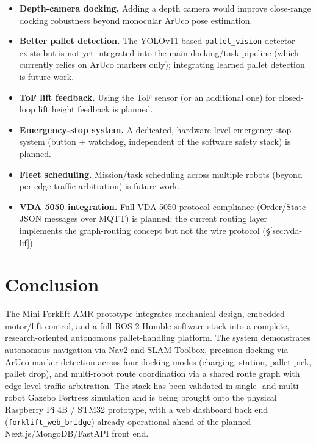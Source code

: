 \documentclass[a4paper, 12pt]{article}
\begin{document}
\begin{itemize}
    validation in a larger, more representative warehouse-like
    environment is future work.
    \item \textbf{Depth-camera docking.} Adding a depth camera would
    improve close-range docking robustness beyond monocular ArUco
    pose estimation.
    \item \textbf{Better pallet detection.} The YOLOv11-based
    \texttt{pallet\_vision} detector exists but is not yet integrated
    into the main docking/task pipeline (which currently relies on
    ArUco markers only); integrating learned pallet detection is
    future work.
    \item \textbf{ToF lift feedback.} Using the ToF sensor (or an
    additional one) for closed-loop lift height feedback is planned.
    \item \textbf{Emergency-stop system.} A dedicated, hardware-level
    emergency-stop system (button + watchdog, independent of the
    software safety stack) is planned.
    \item \textbf{Fleet scheduling.} Mission/task scheduling across
    multiple robots (beyond per-edge traffic arbitration) is future
    work.
    \item \textbf{VDA 5050 integration.} Full VDA 5050 protocol
    compliance (Order/State JSON messages over MQTT) is planned; the
    current routing layer implements the graph-routing concept but not
    the wire protocol (\S\ref{sec:vda-lif}).
\end{itemize}

\section{Conclusion}
\label{sec:conclusion}

The Mini Forklift AMR prototype integrates mechanical design, embedded
motor/lift control, and a full ROS 2 Humble software stack into a
complete, research-oriented autonomous pallet-handling platform. The
system demonstrates autonomous navigation via Nav2 and SLAM Toolbox,
precision docking via ArUco marker detection across four docking modes
(charging, station, pallet pick, pallet drop), and multi-robot route
coordination via a shared route graph with edge-level traffic
arbitration. The stack has been validated in single- and multi-robot
Gazebo Fortress simulation and is being brought onto the physical
Raspberry Pi 4B / STM32 prototype, with a web dashboard back end
(\texttt{forklift\_web\_bridge}) already operational ahead of the
planned Next.js/MongoDB/FastAPI front end.
\end{document}
